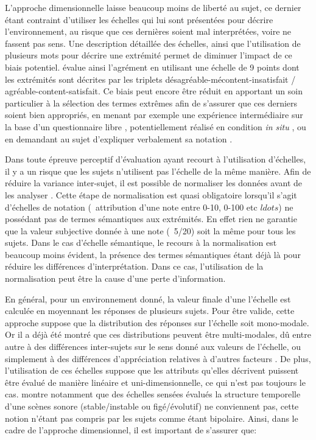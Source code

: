 L'approche dimensionnelle laisse beaucoup moins de  liberté au sujet, ce dernier étant contraint d'utiliser les échelles qui lui sont présentées pour décrire l'environnement, au risque que ces dernières soient mal interprétées, voire ne fassent pas sens. Une description détaillée des échelles, ainsi que l'utilisation de plusieurs mots pour décrire une extrémité permet de diminuer l'impact de ce biais potentiel. \citep{hall2013exploratory} évalue ainsi l'agrément en utilisant une échelle de 9 points dont les extrémités sont décrites par les triplets désagréable-mécontent-insatisfait / agréable-content-satisfait. Ce biais peut encore être réduit en apportant un soin particulier à la sélection des termes extrêmes afin de s'assurer que ces derniers soient bien appropriés, en menant par exemple une expérience intermédiaire sur la base d'un questionnaire libre \citep{guastavino2004perceptual}, potentiellement réalisé en condition \emph{in situ} \citep{kang2010semantic,hong2013designing}, ou en demandant au sujet d'expliquer verbalement sa notation \citep{raimbault2006qualitative}. 

Dans toute épreuve perceptif d'évaluation ayant recourt à l'utilisation d'échelles, il y a un risque que les sujets n'utilisent pas l'échelle de la même manière. Afin de réduire la variance inter-sujet, il est possible de normaliser les données avant de les analyser \citep{defreville2004aactivity,lavandier2006contribution,nielbo2013investigating,hong2013designing}. Cette étape de normalisation est quasi obligatoire lorsqu'il s'agit d'échelles de notation (\eg~attribution d'une note entre 0-10, 0-100 etc $ldots$) ne possédant pas de termes sémantiques aux extrémités. En effet rien ne garantie que la valeur subjective donnée à une note (\eg~5/20) soit la même pour tous les sujets. Dans le cas d'échelle sémantique, le recours à la normalisation est beaucoup moins évident, la présence des termes sémantiques étant déjà là pour réduire les différences d'interprétation. Dans ce cas, l'utilisation de la normalisation peut être la cause d'une perte d'information.

En général, pour un environnement donné, la valeur finale d'une l'échelle est calculée en moyennant les réponses de plusieurs sujets. Pour être valide, cette approche suppose que la distribution des réponses sur l'échelle soit mono-modale. Or il a déjà été montré que ces distributions peuvent être multi-modales, dû entre autre à des différences inter-sujets sur le sens donné aux valeurs de l'échelle, ou simplement à des différences d'appréciation relatives à d'autres facteurs \citep{raimbault2006qualitative}. De plus, l'utilisation de ces échelles suppose que les attributs qu'elles décrivent puissent être évalué de manière linéaire et uni-dimensionnelle, ce qui n'est pas toujours le cas. \citep{raimbault2006qualitative} montre notamment que des échelles sensées évalués la structure temporelle d'une scènes sonore (stable/instable ou figé/évolutif) ne conviennent pas, cette notion n'étant pas compris par les sujets comme étant bipolaire. Ainsi, dans le cadre de l'approche dimensionnel, il est important de s'assurer que:

